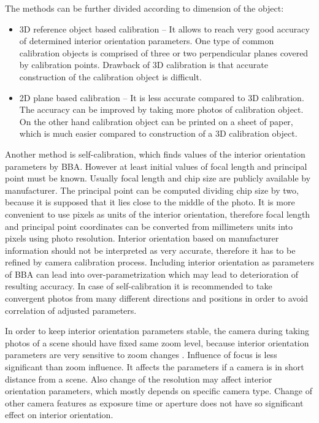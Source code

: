 \documentclass[a4paper,12pt]{article}
\begin{document}
The methods can be further divided according to dimension of the object:


\begin{itemize}
\item 3D reference object based calibration -- It allows to reach very good accuracy of determined 
interior orientation parameters. One type of common calibration objects is comprised of three or two
perpendicular planes covered by calibration points. Drawback of 3D calibration 
is that accurate construction of the calibration object is difficult.
\item 2D plane based calibration -- It is less accurate compared to 3D calibration. 
The accuracy can be improved by taking more photos of calibration object.
On the other hand calibration object can be printed on a sheet of paper, which is much 
easier compared to construction of a 3D calibration object.
\end{itemize}


Another method is self-calibration, which finds values of the interior orientation parameters by BBA.
However at least initial values of focal length and principal point must be known.
Usually focal length and chip size are publicly available by manufacturer. The principal point 
can be computed dividing chip size by two, because it is supposed that it lies close to 
the middle of the photo.
It is more convenient to use 
pixels as units of the interior orientation, therefore focal length and principal point coordinates can be 
converted from millimeters units into pixels using photo resolution. 
Interior orientation based on manufacturer information should not be interpreted as very accurate, therefore 
it has  to be refined by camera calibration process.
Including interior orientation as parameters of BBA
can lead into over-parametrization which may lead to deterioration of resulting accuracy.
In case of self-calibration it is recommended to take convergent photos from many different directions and positions in order
to avoid correlation of adjusted parameters. 


In order to keep interior orientation parameters stable, the camera during taking photos of a scene should have fixed same zoom level,
because interior orientation parameters are very sensitive to zoom changes \cite{labe2004geometric}.
Influence of focus is less significant than zoom influence. It affects the parameters if a camera is in short distance
 from a scene.
Also change of the resolution may affect interior orientation parameters, which mostly depends 
on specific camera type. 
Change of other camera features as exposure time or aperture does not have so significant effect on interior
orientation.
\end{document}
